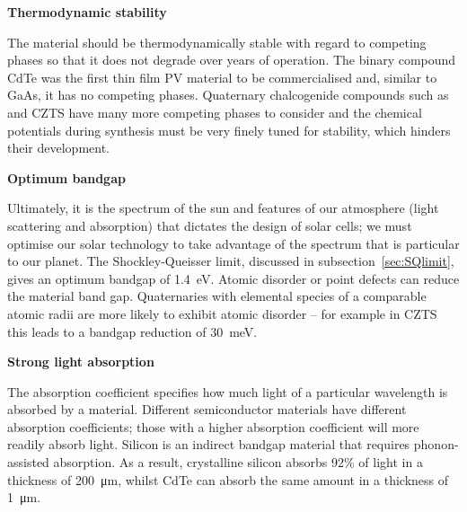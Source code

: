 \textbf{Thermodynamic stability}

The material should be thermodynamically stable with regard to competing phases so that it does not degrade over years of operation. The binary compound CdTe was the first thin film PV material to be commercialised and, similar to GaAs, it has no competing phases. Quaternary chalcogenide compounds such as  and CZTS have many more competing phases to consider and the chemical potentials during synthesis must be very finely tuned for stability, which hinders their development.


\textbf{Optimum bandgap}

Ultimately, it is the spectrum of the sun and features of our atmosphere (light scattering and absorption) that dictates the design of solar cells; we must optimise our solar technology to take advantage of the spectrum that is particular to our planet. The Shockley-Queisser limit, discussed in subsection\ \ref{sec:SQlimit}, gives an optimum bandgap of \SI{1.4}{\electronvolt}.\autocite{Ruhle2016}
Atomic disorder or point defects can reduce the material band gap. Quaternaries with elemental species of a comparable atomic radii are more likely to exhibit atomic disorder -- for example in CZTS this leads to a bandgap reduction of \SI{30}{meV}.\autocite{Rey2018}


\textbf{Strong light absorption}

The absorption coefficient specifies how much light of a particular wavelength is absorbed by a material. Different semiconductor materials have different absorption coefficients; those with a higher absorption coefficient will more readily absorb light. Silicon is an indirect bandgap material that requires phonon-assisted absorption. As a result, crystalline silicon absorbs 92\% of light in a thickness of  \SI{200}{\micro\metre}, whilst CdTe can absorb the same amount in a thickness of \SI{1}{\micro\metre}.\autocite{Poortmans2006}


